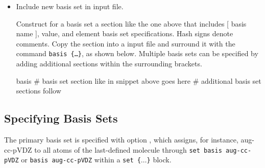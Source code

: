 \begin{itemize}
\item Include new basis set in input file.

Construct for a basis set a section like the one above that includes [ basis name ], 
value, and element basis set specifications. Hash signs denote comments.
Copy the section into a \PSIfour input file and surround it with the command \texttt{basis \{\dots\}}, 
as shown below.
Multiple basis sets can be specified by adding additional sections within the surrounding brackets.
\begin{Snippet}
basis {
# basis set section like in snippet above goes here
# additional basis set sections follow
}
\end{Snippet}
\end{itemize}


\subsection{Specifying Basis Sets}

The primary basis set is specified with option , which assigns,
for instance, aug-cc-pVDZ to all atoms of the last-defined molecule through
\texttt{set basis aug-cc-pVDZ} or \texttt{basis aug-cc-pVDZ} within a \texttt{set \{$\dots$\}} block.




